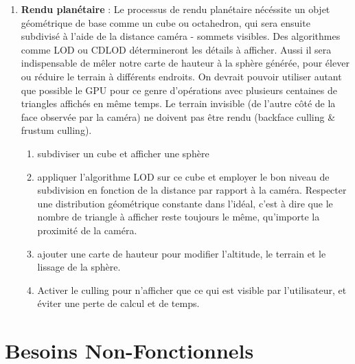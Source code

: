 \documentclass[12pt]{report}
\begin{document}
\begin{enumerate}
\begin{enumerate}
    \end{enumerate}
        \newpage
    \item \textbf{Rendu planétaire} : Le processus de rendu planétaire nécéssite un objet géométrique de base comme un cube ou octahedron, qui sera ensuite subdivisé à l'aide de la distance caméra - sommets visibles. Des algorithmes comme LOD ou CDLOD détermineront les détails à afficher. Aussi il sera indispensable de mêler notre carte de hauteur à la sphère générée, pour élever ou réduire le terrain à différents endroits. On devrait pouvoir utiliser autant que possible le GPU pour ce genre d'opérations avec plusieurs centaines de triangles affichés en même temps. Le terrain invisible (de l'autre côté de la face observée par la caméra) ne doivent pas être rendu (backface culling & frustum culling).
    \begin{enumerate}
        \item subdiviser un cube et afficher une sphère
        \item appliquer l'algorithme LOD sur ce cube et employer le bon niveau de subdivision en fonction de la distance par rapport à la caméra. Respecter une distribution géométrique constante dans l'idéal, c'est à dire que le nombre de triangle à afficher reste toujours le même, qu'importe la proximité de la caméra.
        \item ajouter une carte de hauteur pour modifier l'altitude, le terrain et le lissage de la sphère.
        \item Activer le culling pour n'afficher que ce qui est visible par l'utilisateur, et éviter une perte de calcul et de temps. 
    \end{enumerate}
    
    
\end{enumerate}

\vspace{0.3cm}

\section{Besoins Non-Fonctionnels}
\end{document}
